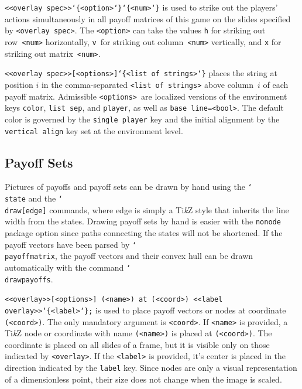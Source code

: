 \documentclass{article}
\newenvironment{desc}{\itemize[leftmargin=50pt]}{\enditemize}
\def\macroarg#1#2{\item[\cmd{#1}] \hskip-2.5pt\texttt{#2}}
\renewcommand{\textbackslash}{\char`\\}
\def\cmd#1{\texttt{\color{cmd}\textbackslash#1}}
\def\leftbrace{\char`\{}
\def\rightbrace{\char`\}}
\def\arg#1{{\color{cmd}\leftbrace}{\color{black}#1}{\color{cmd}\rightbrace}}
\def\optarg[#1]{{\color{player1}[#1]}}
\def\TikZ{Ti\emph{k}Z\xspace}
\begin{document}
\begin{desc}
\macroarg{strike}{<<overlay spec>>\arg{<option>}\arg{<num>}} is used to strike out the players' actions simultaneously in all payoff matrices of this game on the slides specified by \texttt{<overlay spec>}. The \texttt{<option>} can take the values \texttt{h} for striking out row~\texttt{<num>} horizontally, \texttt{v}~for striking out column~\texttt{<num>} vertically, and \texttt{x} for striking out matrix~\texttt{<num>}.

\macroarg{toplabel}{<<overlay spec>>\optarg[<options>]\arg{<list of strings>}} places the string at position $i$ in the comma-separated \texttt{<list of strings>} above column~$i$ of each payoff matrix. Admissible \texttt{<options>}~are localized versions of the environment keys \texttt{color}, \texttt{list sep}, and \texttt{player}, as well as \texttt{base line=<bool>}. The default color is governed by the \texttt{single player} key and the initial alignment by the \texttt{vertical align} key set at the environment level.
\end{desc}


\subsection{Payoff Sets}

Pictures of payoffs and payoff sets can be drawn by hand using the \cmd{state} and the \cmd{draw\optarg[edge]} commands, where edge is simply a \TikZ style that inherits the line width from the states. Drawing payoff sets by hand is easier with the \texttt{nonode} package option since paths connecting the states will not be shortened. If the payoff vectors have been parsed by \cmd{payoffmatrix}, the payoff vectors and their convex hull can be drawn automatically with the command \cmd{drawpayoffs}.

\begin{desc}
\macroarg{state}{<<overlay>>\optarg[<options>] (<name>) at (<coord>) <<label overlay>>\arg{<label>};} is used to place payoff vectors or nodes at coordinate \texttt{(<coord>)}. The only mandatory argument is \texttt{<coord>}. If \texttt{<name>} is provided, a \TikZ node or coordinate with name \texttt{(<name>)} is placed at \texttt{(<coord>)}. The coordinate is placed on all slides of a frame, but it is visible only on those indicated by \texttt{<overlay>}. If the \texttt{<label>} is provided, it's center is placed in the direction indicated by the \texttt{label} key. Since nodes are only a visual representation of a dimensionless point, their size does not change when the image is scaled.
\end{desc}
\end{document}
